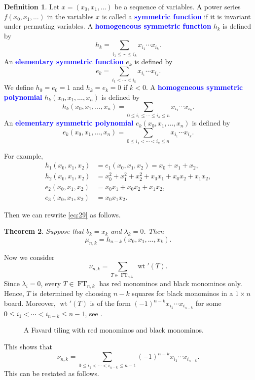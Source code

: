 \documentclass[oneside]{book}
\numberwithin{equation}{section}
\newtheorem{thm}{Theorem}[section]
\theoremstyle{definition}
\newtheorem{defn}[thm]{Definition}
\newcommand\FT{\operatorname{FT}}
\newcommand\wt{\operatorname{wt}}
\renewcommand\emph[1]{\textcolor{blue}{\bf #1}}
\def\BM#1{\draw [line width=2pt] (#1+0.9,0.9) rectangle +(-0.8,-0.8);}
\def\RM#1{\draw [line width=2pt,red] (#1+0.9,0.9) rectangle +(-0.8,-0.8);}
\begin{document}
\begin{defn}\label{def:1}
  Let \( x=(x_0,x_1,\dots) \) be a sequence of variables. A power
  series \( f(x_0,x_1,\dots) \) in the variables \( x \) is called a
  \emph{symmetric function} if it is invariant under permuting
  variables. A \emph{homogeneous symmetric function}
  \( h_k \) is defined by
  \[
    h_k = \sum_{i_1 \le \cdots \le i_{k}} x_{i_1}\cdots x_{i_{k}}.
  \]
  An \emph{elementary symmetric function}
  \( e_k \) is defined by
  \[
    e_k = \sum_{i_1 < \cdots < i_{k}} x_{i_1}\cdots x_{i_{k}}.
  \]
  We define \( h_0 = e_0 = 1 \) and \( h_k = e_k = 0 \) if \( k<0 \).
  A \emph{homogeneous symmetric polynomial} \( h_k(x_0,x_1,\dots,x_n) \) is
  defined by
  \[
    h_k(x_0,x_1,\dots,x_n) = \sum_{0\le i_1 \le \cdots \le i_{k} \le n}
    x_{i_1}\cdots x_{i_{k}}.
  \]
  An \emph{elementary symmetric polynomial} \( e_k(x_0,x_1,\dots,x_n) \)
  is defined by
  \[
    e_k(x_0,x_1,\dots,x_n) = \sum_{0\le i_1 < \cdots < i_{k} \le n}
    x_{i_1}\cdots x_{i_{k}}.
  \]
\end{defn}

For example,
\begin{align*}
  h_1(x_0,x_1,x_2) &= e_1(x_0,x_1,x_2) = x_0 + x_1 + x_2,\\
  h_2(x_0,x_1,x_2) &= x_0^2+x_1^2+x_2^2 + x_0x_1+x_0x_2+x_1x_2,\\
  e_2(x_0,x_1,x_2) &= x_0x_1+x_0x_2+x_1x_2,\\
  e_3(x_0,x_1,x_2) &= x_0x_1x_2.
\end{align*}

Then we can rewrite \eqref{eq:29} as follows.

\begin{thm}\label{thm:3}
  Suppose that \( b_k=x_{k} \) and \( \lambda_k =0 \).
  Then
  \[
    \mu_{n,k} = h_{n-k}(x_0,x_1,\dots,x_{k}).
  \]
\end{thm}

Now we consider
\[
  \nu_{n,k} = \sum_{T\in \FT_{n,k}} \wt'(T).
\]
Since \( \lambda_i=0 \), every \( T\in \FT_{n,k} \) has red monominos
and black monominos only. Hence, \( T \) is determined by choosing
\( n-k \) squares for black monominos in a \( 1\times n \) board.
Moreover, \( \wt'(T) \) is of the form
\( (-1)^{n-k} x_{i_1} \cdots x_{i_{n-k}} \) for some
\( 0\le i_1 < \cdots <i_{n-k} \le n-1 \), see .
\begin{figure}
  \centering
  \caption{A Favard tiling with red monominos and black monominos.}
  \label{fig:7}
\end{figure}
This shows that
\[
    \nu_{n,k} = \sum_{0\le i_1 < \cdots <i_{n-k} \le n-1}(-1)^{n-k} x_{i_1} \cdots x_{i_{n-k}}.
\]
This can be restated as follows.
\end{document}
